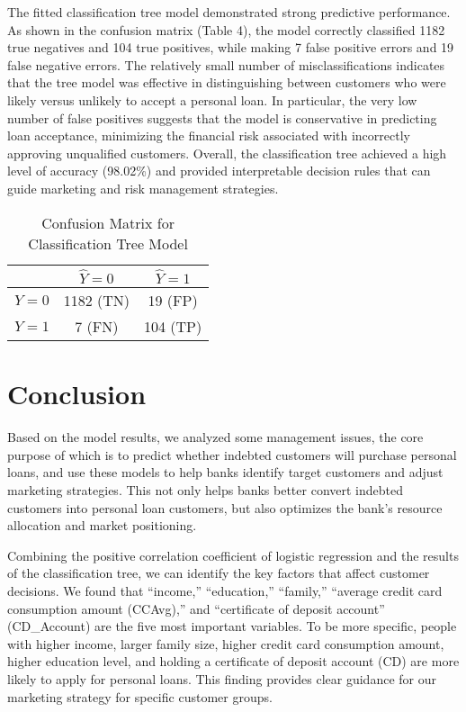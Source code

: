 \documentclass[12pt]{article}
\begin{document}
The fitted classification tree model demonstrated strong predictive performance. As shown in the confusion matrix (Table 4), the model correctly classified 1182 true negatives and 104 true positives, while making 7 false positive errors and 19 false negative errors. The relatively small number of misclassifications indicates that the tree model was effective in distinguishing between customers who were likely versus unlikely to accept a personal loan. In particular, the very low number of false positives suggests that the model is conservative in predicting loan acceptance, minimizing the financial risk associated with incorrectly approving unqualified customers. Overall, the classification tree achieved a high level of accuracy (98.02\%) and provided interpretable decision rules that can guide marketing and risk management strategies.
\begin{table}[h]
\centering
\renewcommand{\arraystretch}{1.5}
\begin{tabular}{|c|c|c|}
\hline
\rowcolor{blue!30}
 & $\hat{Y}=0$ & $\hat{Y}=1$ \\
\hline
$Y=0$ & 1182 (TN) & 19 (FP) \\
\hline
$Y=1$ & 7 (FN) & 104 (TP) \\
\hline
\end{tabular}
\caption{Confusion Matrix for Classification Tree Model}
\label{tab:confusion_matrix}
\end{table}

\section{Conclusion}
Based on the model results, we analyzed some management issues, the core purpose of which is to predict whether indebted customers will purchase personal loans, and use these models to help banks identify target customers and adjust marketing strategies. This not only helps banks better convert indebted customers into personal loan customers, but also optimizes the bank's resource allocation and market positioning.

Combining the positive correlation coefficient of logistic regression and the results of the classification tree, we can identify the key factors that affect customer decisions. We found that ``income,'' ``education,'' ``family,'' ``average credit card consumption amount (CCAvg),'' and ``certificate of deposit account'' (CD\_Account) are the five most important variables. To be more specific, people with higher income, larger family size, higher credit card consumption amount, higher education level, and holding a certificate of deposit account (CD) are more likely to apply for personal loans. This finding provides clear guidance for our marketing strategy for specific customer groups.
\end{document}
